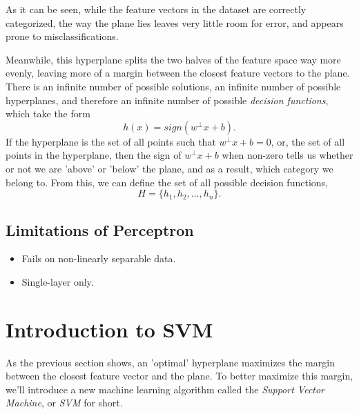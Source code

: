 As it can be seen, while the feature vectors in the dataset are correctly categorized, the way the plane lies leaves very little room for error, and appears prone to misclassifications.


Meanwhile, this hyperplane splits the two halves of the feature space way more evenly, leaving more of a margin between the closest feature vectors to the plane. There is an infinite number of possible solutions, an infinite number of possible hyperplanes, and therefore an infinite number of possible \textit{decision functions}, which take the form
\[
    h(x) = sign(w^\perp x+b).
\]
If the hyperplane is the set of all points such that $w^\perp x+b=0$, or, the set of all points in the hyperplane, then the sign of $w^\perp x+b$ when non-zero tells us whether or not we are 'above' or 'below' the plane, and as a result, which category we belong to. From this, we can define the set of all possible decision functions,
\[
    H = \{h_1, h_2, \dots, h_n\}.
\]

\subsection{Limitations of Perceptron}
\begin{itemize}
    \item Fails on non-linearly separable data.
    \item Single-layer only.
\end{itemize}

\section{Introduction to SVM}
As the previous section shows, an 'optimal' hyperplane maximizes the margin between the closest feature vector and the plane. To better maximize this margin, we'll introduce a new machine learning algorithm called the \textit{Support Vector Machine}\cite{scholkopf2002learning}\cite{vapnik1998statistical}, or \textit{SVM} for short.

